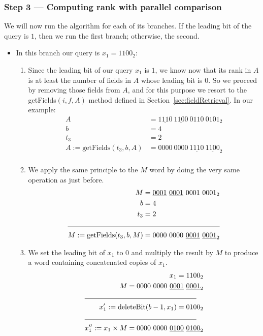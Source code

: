 \subsubsection{Step 3 --- Computing rank with parallel comparison}

We will now run the algorithm for each of its branches. If the leading bit of the query is $1$, then we run the first branch; otherwise, the second.
\begin{itemize}
    \item
    In this branch our query is $x_1 = 1100_2$:
    \begin{enumerate}
        \item
        Since the leading bit of our query $x_1$ is $1$, we know now that its rank in $A$ is at least the number of fields in $A$ whose leading bit is $0$. So we proceed by removing those fields from $A$, and for this purpose we resort to the getFields$(i, f, A)$ method defined in Section~\ref{sec:fieldRetrieval}. In our example:
        \begin{align*}
            A &= \underline{1110}\ \underline{1100}\ 0110\ 0101_2 \\
            b &= 4 \\
            t_3 &= 2 \\
            A := \text{getFields}(t_3, b, A) &= 0000\ 0000\ \underline{1110}\ \underline{1100}_2 \\
        \end{align*}
        
        \item
        We apply the same principle to the $M$ word by doing the very same operation as just before.
        \begin{align*}
            M &= \underline{0001}\ \underline{0001}\ 0001\ 0001_2 \\
            b &= 4 \\
            t_3 &= 2 \\
            \cline{1-2}
            M := \text{getFields}(t_3, b, M) &= 0000\ 0000\ \underline{0001}\ \underline{0001}_2 \\
        \end{align*}
        
        \item
        We set the leading bit of $x_1$ to $0$ and multiply the result by $M$ to produce a word containing concatenated copies of $x_1$.
        \begin{align*}
            x_1 = 1100_2 \\
            M = 0000\ 0000\ \underline{0001}\ \underline{0001}_2 \\
            \cline{1-2}
            x_1' := \text{deleteBit}(b - 1, x_1) = 0100_2 \\
            \cline{1-2}
            x_1'' := x_1 \times M = 0000\ 0000\ \underline{0100}\ \underline{0100}_2 \\
        \end{align*}
        

\end{enumerate}
\end{itemize}
